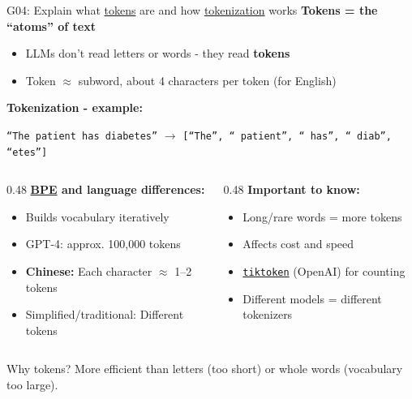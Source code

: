 \documentclass[aspectratio=169, 10pt]{beamer}
\begin{document}
\begin{frame}{G04: Explain what \href{https://en.wikipedia.org/wiki/Lexical_analysis\#Token}{tokens} are and how \href{https://en.wikipedia.org/wiki/Tokenization_(lexical_analysis)}{tokenization} works}
    \textbf{Tokens = the ``atoms'' of text}
    \begin{itemize}
        \item LLMs don't read letters or words - they read \textbf{tokens}
        \item Token $\approx$ subword, about 4 characters per token (for English)
    \end{itemize}

    \vspace{0.15cm}
    \textbf{Tokenization - example:}
    \begin{center}
        \footnotesize
        \texttt{``The patient has diabetes''} $\rightarrow$ \texttt{[``The'', `` patient'', `` has'', `` diab'', ``etes'']}
    \end{center}

    \vspace{0.1cm}
    \begin{columns}[T]
        \begin{column}{0.48\textwidth}
            \textbf{\href{https://en.wikipedia.org/wiki/Byte_pair_encoding}{BPE} and language differences:}
            \footnotesize
            \begin{itemize}
                \item Builds vocabulary iteratively
                \item GPT-4: approx. 100,000 tokens
                \item \textbf{Chinese:} Each character $\approx$ 1--2 tokens
                \item Simplified/traditional: Different tokens
            \end{itemize}
        \end{column}
        \begin{column}{0.48\textwidth}
            \textbf{Important to know:}
            \footnotesize
            \begin{itemize}
                \item Long/rare words = more tokens
                \item Affects cost and speed
                \item \href{https://github.com/openai/tiktoken}{\texttt{tiktoken}} (OpenAI) for counting
                \item Different models = different tokenizers
            \end{itemize}
        \end{column}
    \end{columns}

    \begin{block}{\footnotesize Why tokens?}
        \footnotesize More efficient than letters (too short) or whole words (vocabulary too large).
    \end{block}
\end{frame}
\end{document}
